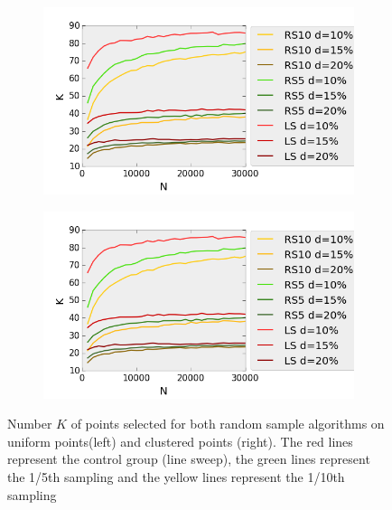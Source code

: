 \begin{figure}[H] 
  \begin{subfigure}[b]{0.5\linewidth}
    \centering
    \includegraphics[width=0.9\linewidth]{Pictures/unif_ls_rs_k} 
    \label{fig:unif_ls_rs_k} 
    \vspace{4ex}
  \end{subfigure}%
  \begin{subfigure}[b]{0.5\linewidth}
    \centering
    \includegraphics[width=0.9\linewidth]{Pictures/unif_ls_rs_k} 
    \label{fig:clus_ls_rs_k} 
    \vspace{4ex}
  \end{subfigure}
  \caption{Number $K$ of points selected for both random sample algorithms on uniform points(left) and clustered points (right). The red lines represent the control group (line sweep), the green lines represent the 1/5th sampling and the yellow lines represent the 1/10th sampling}
  \label{fig:ls_rs_k} 
\end{figure}

